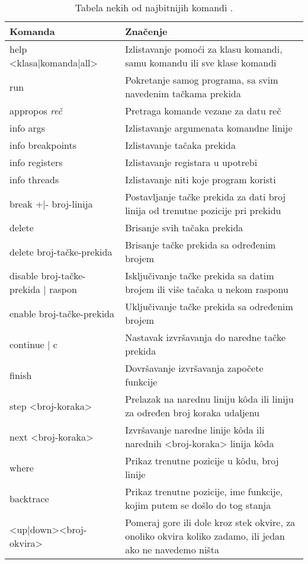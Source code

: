 \documentclass[a4paper]{article}
\begin{document}
\begin{table}[H]
\begin{center}
\caption{Tabela nekih od najbitnijih komandi \cite{commands}.}
\begin{tabular}{|p{4cm}|p{6cm}|} \hline
Komanda & Značenje\\ \hline
help <klasa|komanda|all> & Izlistavanje pomoći za klasu komandi, samu komandu ili sve klase komandi\\ \hline
run & Pokretanje samog programa, sa svim navedenim tačkama prekida \\ \hline
appropos \textit{reč} & Pretraga komande vezane za datu reč\\ \hline
info args & Izlistavanje argumenata komandne linije \\ \hline
info breakpoints & Izlistavanje tačaka prekida \\ \hline
info registers & Izlistavanje registara u upotrebi \\ \hline
info threads & Izlistavanje niti koje program koristi \\ \hline
break +|- broj-linija & Postavljanje tačke prekida za dati broj linija od trenutne pozicije pri prekidu \\ \hline
delete & Brisanje svih tačaka prekida \\ \hline
delete broj-tačke-prekida & Brisanje tačke prekida sa određenim brojem \\ \hline
disable broj-tačke-prekida | raspon & Isključivanje tačke prekida sa datim brojem ili više tačaka u nekom rasponu \\ \hline
enable broj-tačke-prekida & Uključivanje tačke prekida sa određenim brojem \\ \hline
continue | c & Nastavak izvršavanja do naredne tačke prekida \\ \hline
finish & Dovršavanje izvršavanja započete funkcije \\ \hline
step <broj-koraka> & Prelazak na narednu liniju k\^{o}da ili liniju za određen broj koraka udaljenu \\ \hline
next <broj-koraka> & Izvršavanje naredne linije k\^{o}da ili narednih <broj-koraka> linija k\^{o}da \\ \hline
where & Prikaz trenutne pozicije u k\^{o}du, broj linije \\ \hline
backtrace & Prikaz trenutne pozicije, ime funkcije, kojim putem se došlo do tog stanja\\ \hline
<up|down><broj-okvira> & Pomeraj gore ili dole kroz stek okvire, za onoliko okvira koliko zadamo, ili jedan ako ne navedemo ništa \\ \hline
\end{tabular}
\label{tab:tabelaKonzola}
\end{center}
\end{table}
\end{document}
